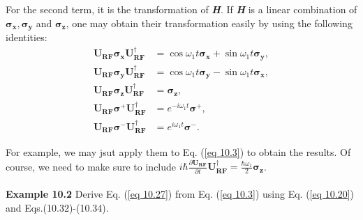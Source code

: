 \documentclass{article}
\newcommand{\bfit}[1]{\textit{\textbf{#1}}}
\begin{document}
For the second term, it is the transformation of \bfit{H}. If \bfit{H} is a linear combination of
$\boldsymbol{\sigma_x}, \boldsymbol{\sigma_y}$ and $\boldsymbol{\sigma_z}$, one may obtain their transformation
easily by using the following identities:
\begin{align*}\label{eq 10.32}
    \boldsymbol{U_{RF}\sigma_x}\boldsymbol{U}^\dagger_{\boldsymbol{RF}}&=\cos\omega_1t\boldsymbol{\sigma_x}+\sin\omega_1t\boldsymbol{\sigma_y},\tag{10.32}\\
    \boldsymbol{U_{RF}\sigma_y}\boldsymbol{U}^\dagger_{\boldsymbol{RF}}&=\cos\omega_1t\boldsymbol{\sigma_y}-\sin\omega_1t\boldsymbol{\sigma_x},\tag{10.33}\\
    \boldsymbol{U_{RF}\sigma_z}\boldsymbol{U}^\dagger_{\boldsymbol{RF}}&=\boldsymbol{\sigma_z},\tag{10.34}\\
    \boldsymbol{U_{RF}\sigma^+}\boldsymbol{U}^\dagger_{\boldsymbol{RF}}&=e^{-i\omega_1t}\boldsymbol{\sigma^+},\tag{10.35}\\
    \boldsymbol{U_{RF}\sigma^-}\boldsymbol{U}^\dagger_{\boldsymbol{RF}}&=e^{i\omega_1t}\boldsymbol{\sigma^-}.\tag{10.36}
\end{align*}

For example, we may jsut apply them to Eq. (\ref{eq 10.3}) to obtain the results. Of course, we need to make sure to include
$i\hbar\frac{\partial \boldsymbol{U_{RF}}}{\partial t}\boldsymbol{U}^\dagger_{\boldsymbol{RF}}=\frac{\hbar\omega_1}{2}\boldsymbol{\sigma_z}$.\\\\
\textbf{Example 10.2} Derive Eq. (\ref{eq 10.27}) from Eq. (\ref{eq 10.3}) using Eq. (\ref{eq 10.20}) and Eqs.(10.32)-(10.34).
\end{document}
